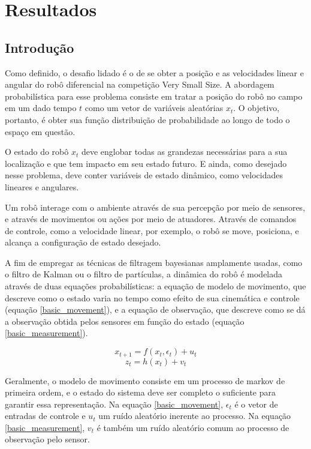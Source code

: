 \documentclass[paper=a4, fontsize=11pt]{scrartcl}
\begin{document}
\section{Resultados}

\subsection{Introdução}

Como definido, o desafio lidado é o de se obter a posição e as velocidades linear e angular do robô diferencial na competição Very Small Size. A abordagem probabilística para esse problema consiste em tratar a posição do robô no campo em um dado tempo $t$ como um vetor de variáveis aleatórias $x_t$. O objetivo, portanto, é obter sua função distribuição de probabilidade ao longo de todo o espaço em questão.

O estado do robô $x_t$ deve englobar todas as grandezas necessárias para a sua localização e que tem impacto em seu estado futuro. E ainda, como desejado nesse problema, deve conter variáveis de estado dinâmico, como velocidades lineares e angulares.

Um robô interage com o ambiente através de sua percepção por meio de sensores, e através de movimentos ou ações por meio de atuadores. Através de comandos de controle, como a velocidade linear, por exemplo, o robô se move, posiciona, e alcança a configuração de estado desejado.

A fim de empregar as técnicas de filtragem bayesianas amplamente usadas, como o filtro de Kalman ou o filtro de partículas, a dinâmica do robô é modelada através de duas equações probabilísticas: a equação de modelo de movimento, que descreve como o estado varia no tempo como efeito de sua cinemática e controle (equação \eqref{basic_movement}), e a equação de observação, que descreve como se dá a observação obtida pelos sensores em função do estado (equação \eqref{basic_measurement}).


\begin{equation}
\label{basic_movement}
x_{t+1}=f(x_t,\epsilon_t)+u_t
\end{equation}
\begin{equation}
\label{basic_measurement}
z_t=h(x_t)+v_t
\end{equation}

Geralmente, o modelo de movimento consiste em um processo de markov de primeira ordem, e o estado do sistema deve ser completo o suficiente para garantir essa representação. Na equação \eqref{basic_movement}, $\epsilon_t$ é o vetor de entradas de controle e $u_t$ um ruído aleatório inerente ao processo. Na equação \eqref{basic_measurement}, $v_t$ é também um ruído aleatório comum ao processo de observação pelo sensor.
\end{document}
